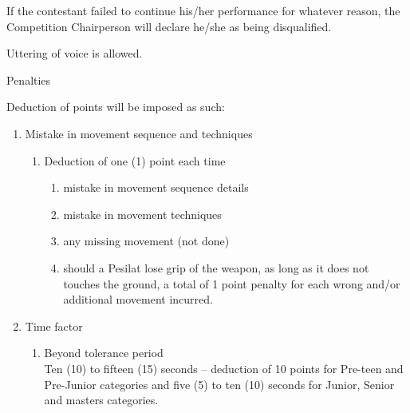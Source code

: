 \begin{legal}
\begin{legal}
\begin{legal}
        \item \label{pt:failed_to_continue} If the contestant failed to continue his/her performance for whatever reason, the  
            Competition Chairperson will declare he/she as being disqualified.

        \item Uttering of voice is allowed.
        \end{legal}

    \item Penalties
        \begin{legal}
        \item \label{pt:tunggal_deductions} Deduction of points will be imposed as such:
            \begin{enumerate}[label=\alph*.]

            \item Mistake in movement sequence and techniques
                \begin{enumerate}[label*=\arabic*.]
                \item Deduction of one (1) point each time
                    \begin{enumerate}[label=\roman*.]
                    \item mistake in movement sequence details
                    \item mistake in movement techniques
                    \item any missing movement (not done)
                    \item should a Pesilat lose grip of the weapon, as long as it does not touches the ground, 
                        a total of 1 point penalty for each wrong and/or additional movement incurred. 
                    \end{enumerate}
                \end{enumerate}

            \item Time factor
                \begin{enumerate}[label*=\arabic*.]
                \item \label{pt:tunggal_deduction_beyond_time} Beyond tolerance period \\
                    Ten (10) to fifteen (15) seconds – deduction of 10 points for Pre-teen and Pre-Junior 
                    categories and five (5) to ten (10) seconds for Junior, Senior and masters categories.\\


\end{enumerate}
\end{enumerate}
\end{legal}
\end{legal}
\end{legal}
